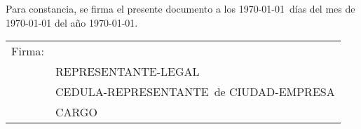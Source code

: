 \documentclass[11pt,a4paper]{letter} %
\def\Who{REPRESENTANTE-LEGAL} %
\def\What{CARGO} %
\def\CC{CEDULA-REPRESENTANTE}
\def\ciudadCC{CIUDAD-EMPRESA}
\begin{document}
\begin{letter}
\noindent Para constancia, se firma el presente documento a los \usrday\today \ días del mes de \hspace{-3.6em} \usrmonth\today \hspace{-1em} del año \usryear\today.

\closing{ }

\begin{tabular}{@{}p{0.7in}p{4in}@{}}
Firma: & \hrulefill \\
& \Who \\
& \CC\ de \ciudadCC \\
& \What \\
\end{tabular}

\end{letter}
\end{document}
